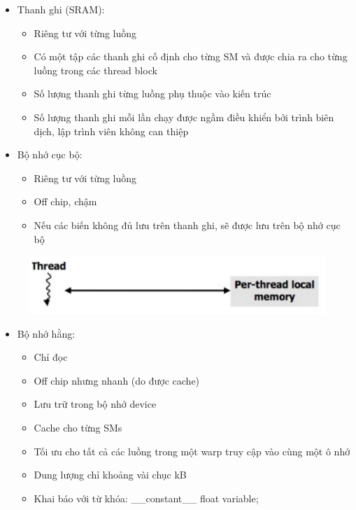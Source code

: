 \documentclass[14pt, a4paper]{article}
\numberwithin{equation}{section}
\numberwithin{figure}{section}
\numberwithin{dl}{section}
\numberwithin{md}{section}
\numberwithin{bd}{section}
\numberwithin{dn}{section}
\numberwithin{hq}{section}
\begin{document}
\begin{itemize}
    \item Thanh ghi (SRAM):
    \begin{itemize}
        \item Riêng tư với từng luồng
        \item Có một tập các thanh ghi cố định cho từng SM và được chia ra cho từng luồng trong các thread block 
        \item Số lượng thanh ghi từng luồng phụ thuộc vào kiến trúc
        \item Số lượng thanh ghi mỗi lần chạy được ngầm điều khiển bởi trình biên dịch, lập trình viên không can thiệp
    \end{itemize}
    \item Bộ nhớ cục bộ:
    \begin{itemize}
        \item Riêng tư với từng luồng
        \item Off chip, chậm
        \item Nếu các biến không đủ lưu trên thanh ghi, sẽ được lưu trên bộ nhớ cục bộ
    \end{itemize}
\end{itemize}

\begin{figure}[H]
    \centering
    \includegraphics[width=0.7\linewidth]{figures/CUDA/GPU_Per_Thread_Memory.png}
\end{figure}

\begin{itemize}
    \item Bộ nhớ hằng:
    \begin{itemize}
        \item Chỉ đọc
        \item Off chip nhưng nhanh (do được cache)
        \item Lưu trữ trong bộ nhớ device
        \item Cache cho từng SMs 
        \item Tối ưu cho tất cả các luồng trong một warp truy cập vào cùng một ô nhớ
        \item Dung lượng chỉ khoảng vài chục kB 
        \item Khai báo với từ khóa: \_\_constant\_\_ float variable;
    \end{itemize}
\end{itemize}
\end{document}
